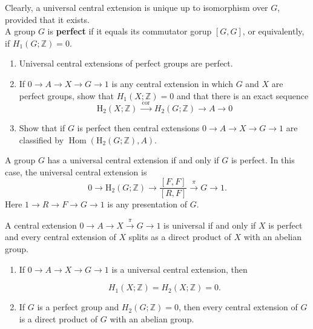 Clearly, a universal central extension is unique up to isomorphism over $G$, provided that it exists.\\
A group $G$ is \textbf{perfect} if it equals its commutator gorup $[G, G]$, or equivalently, if $H_1(G ; \mathbb{Z})=0$.\\



\begin{prop}
\begin{enumerate}
    \item Universal central extensions of perfect groups are perfect.
    \item If $0 \rightarrow A \rightarrow X \rightarrow G \rightarrow 1$ is any central extension in which $G$ and $X$ are perfect groups, show that $H_1(X ; \mathbb{Z})=0$ and that there is an exact sequence
    $$
    \mathrm{H}_2(X ; \mathbb{Z}) \xrightarrow{\text { cor }} H_2(G ; \mathbb{Z}) \rightarrow A \rightarrow 0
    $$
    \item Show that if $G$ is perfect then central extensions $0 \rightarrow A \rightarrow X \rightarrow G \rightarrow 1$ are classified by $\operatorname{Hom}\left(\mathrm{H}_2(G ; \mathbb{Z}), A\right)$. 
\end{enumerate}
\end{prop}

\begin{theo} %
A group $G$ has a universal central extension if and only if $G$ is perfect. In this case, the universal central extension is
 $$0 \rightarrow \mathrm{H}_2(G ; \mathbb{Z}) \rightarrow \frac{[F, F]}{[R, F]} \xrightarrow{\pi} G \rightarrow 1.$$
Here $1 \rightarrow R \rightarrow F \rightarrow G \rightarrow 1$ is any presentation of $G$.
\end{theo}

\begin{prop} A central extension $0 \rightarrow A \rightarrow X \xrightarrow{\pi} G \rightarrow 1$ is universal if and only if $X$ is perfect and every central extension of $X$ splits as a direct product of $X$ with an abelian group. 
\end{prop}

\begin{coro}
    \begin{enumerate}
        \item If $0 \rightarrow A \rightarrow X \rightarrow G \rightarrow 1$ is a universal central extension, then

        $$
        H_1(X ; \mathbb{Z})=H_2(X ; \mathbb{Z})=0 .
        $$
        \item If $G$ is a perfect group and $H_2(G ; \mathbb{Z})=0$, then every central extension of $G$ is a direct product of $G$ with an abelian group.
    \end{enumerate}
\end{coro}


